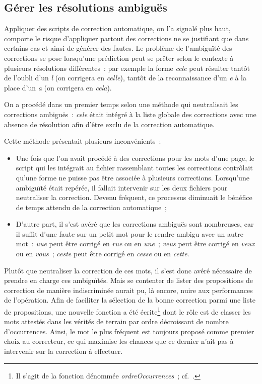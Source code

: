 \documentclass[a4paper,12pt,twoside]{book}
\begin{document}
			\subsection{Gérer les résolutions ambiguës}
				Appliquer des scripts de correction automatique, on l'a signalé plus haut, comporte le risque d'appliquer partout des corrections ne se justifiant que dans certains cas et ainsi de générer des fautes. Le problème de l'ambiguïté des corrections se pose lorsqu'une \gls{prédiction} peut se prêter selon le contexte à plusieurs résolutions différentes~: par exemple la forme \textit{cele} peut résulter tantôt de l'oubli d'un \textit{l} (on corrigera en \textit{celle}), tantôt de la reconnaissance d'un \textit{e} à la place d'un \textit{a} (on corrigera en \textit{cela}).
							
				On a procédé dans un premier temps selon une méthode qui neutralisait les corrections ambiguës~: \textit{cele} était intégré à la liste globale des corrections avec une absence de résolution afin d'être exclu de la correction automatique.
				
				Cette méthode présentait plusieurs inconvénients~:

				\begin{itemize}
					\item Une fois que l'on avait procédé à des corrections pour les mots d'une page, le script qui les intégrait au fichier rassemblant toutes les corrections contrôlait qu'une forme ne puisse pas être associée à plusieurs corrections. Lorsqu'une ambiguïté était repérée, il fallait intervenir sur les deux fichiers pour neutraliser la correction. Devenu fréquent, ce processus diminuait le bénéfice de temps attendu de la correction automatique~;

					\item D'autre part, il s'est avéré que les corrections ambiguës sont nombreuses, car il suffit d'une faute sur un petit mot pour le rendre ambigu avec un autre mot~: \textit{uue} peut être corrigé en \textit{rue} ou en \textit{une}~; \textit{veus} peut être corrigé en \textit{veux} ou en \textit{vous}~; \textit{ceste} peut être corrigé en \textit{cesse} ou en \textit{cette}.
				\end{itemize}
				
				Plutôt que neutraliser la correction de ces mots, il s'est donc avéré nécessaire de prendre en charge ces ambiguïtés. Mais se contenter de lister des propositions de correction de manière indiscriminée aurait pu, là encore, nuire aux performances de l'opération. Afin de faciliter la sélection de la bonne correction parmi une liste de propositions, une nouvelle fonction a été écrite\footnote{Il s'agit de la fonction dénommée \textit{ordreOccurrences}~; cf.~\cite{biaySpellcheckTextsPy2022}.} dont le rôle est de classer les mots attestés dans les vérités de terrain par ordre décroissant de nombre d'occurrences. Ainsi, le mot le plus fréquent est toujours proposé comme premier choix au correcteur, ce qui maximise les chances que ce dernier n'ait pas à intervenir sur la correction à effectuer.
			
\end{document}
